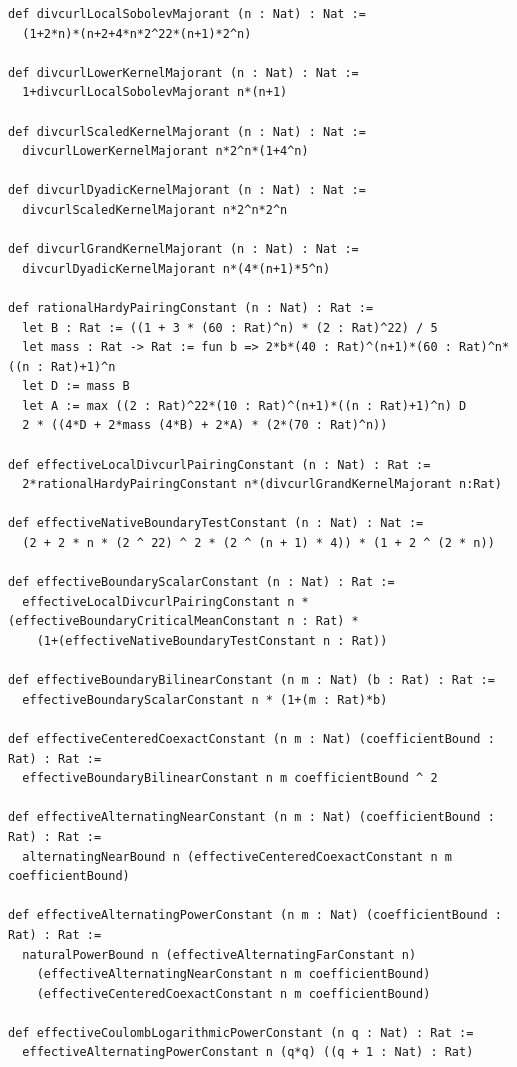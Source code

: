 \documentclass[11pt,a4paper]{article}
\numberwithin{equation}{section}
\theoremstyle{definition}
\theoremstyle{remark}
\begin{document}
\begin{lstlisting}
def divcurlLocalSobolevMajorant (n : Nat) : Nat :=
  (1+2*n)*(n+2+4*n*2^22*(n+1)*2^n)

def divcurlLowerKernelMajorant (n : Nat) : Nat :=
  1+divcurlLocalSobolevMajorant n*(n+1)

def divcurlScaledKernelMajorant (n : Nat) : Nat :=
  divcurlLowerKernelMajorant n*2^n*(1+4^n)

def divcurlDyadicKernelMajorant (n : Nat) : Nat :=
  divcurlScaledKernelMajorant n*2^n*2^n

def divcurlGrandKernelMajorant (n : Nat) : Nat :=
  divcurlDyadicKernelMajorant n*(4*(n+1)*5^n)

def rationalHardyPairingConstant (n : Nat) : Rat :=
  let B : Rat := ((1 + 3 * (60 : Rat)^n) * (2 : Rat)^22) / 5
  let mass : Rat -> Rat := fun b => 2*b*(40 : Rat)^(n+1)*(60 : Rat)^n*((n : Rat)+1)^n
  let D := mass B
  let A := max ((2 : Rat)^22*(10 : Rat)^(n+1)*((n : Rat)+1)^n) D
  2 * ((4*D + 2*mass (4*B) + 2*A) * (2*(70 : Rat)^n))

def effectiveLocalDivcurlPairingConstant (n : Nat) : Rat :=
  2*rationalHardyPairingConstant n*(divcurlGrandKernelMajorant n:Rat)

def effectiveNativeBoundaryTestConstant (n : Nat) : Nat :=
  (2 + 2 * n * (2 ^ 22) ^ 2 * (2 ^ (n + 1) * 4)) * (1 + 2 ^ (2 * n))

def effectiveBoundaryScalarConstant (n : Nat) : Rat :=
  effectiveLocalDivcurlPairingConstant n * (effectiveBoundaryCriticalMeanConstant n : Rat) *
    (1+(effectiveNativeBoundaryTestConstant n : Rat))

def effectiveBoundaryBilinearConstant (n m : Nat) (b : Rat) : Rat :=
  effectiveBoundaryScalarConstant n * (1+(m : Rat)*b)

def effectiveCenteredCoexactConstant (n m : Nat) (coefficientBound : Rat) : Rat :=
  effectiveBoundaryBilinearConstant n m coefficientBound ^ 2

def effectiveAlternatingNearConstant (n m : Nat) (coefficientBound : Rat) : Rat :=
  alternatingNearBound n (effectiveCenteredCoexactConstant n m coefficientBound)

def effectiveAlternatingPowerConstant (n m : Nat) (coefficientBound : Rat) : Rat :=
  naturalPowerBound n (effectiveAlternatingFarConstant n)
    (effectiveAlternatingNearConstant n m coefficientBound)
    (effectiveCenteredCoexactConstant n m coefficientBound)

def effectiveCoulombLogarithmicPowerConstant (n q : Nat) : Rat :=
  effectiveAlternatingPowerConstant n (q*q) ((q + 1 : Nat) : Rat)


\end{lstlisting}
\end{document}
